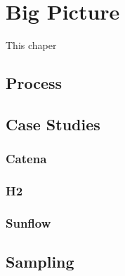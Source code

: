 \chapter{Big Picture}
\label{chap:method}
This chaper 
\section{Process}


\section{Case Studies}
\label{case_studies}


% 

\subsection{Catena}


\subsection{H2}


\subsection{Sunflow}


\section{Sampling}
\label{perf_measure_sampling}

